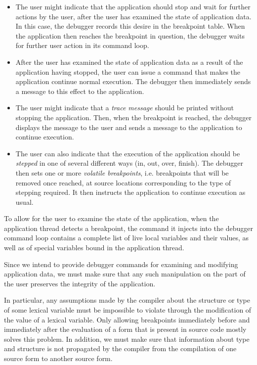\begin{itemize}
\item The user might indicate that the application should stop and
  wait for further actions by the user, after the user has examined
  the state of application data.  In this case, the debugger records
  this desire in the breakpoint table.  When the application then
  reaches the breakpoint in question, the debugger waits for further
  user action in its command loop.
\item After the user has examined the state of application data as a
  result of the application having stopped, the user can issue a
  command that makes the application continue normal execution.  The
  debugger then immediately sends a message to this effect to the
  application.
\item The user might indicate that a \emph{trace message} should be
  printed without stopping the application.  Then, when the breakpoint
  is reached, the debugger displays the message to the user and sends
  a message to the application to continue execution.
\item The user can also indicate that the execution of the application
  should be \emph{stepped} in one of several different ways (in, out,
  over, finish).  The debugger then sets one or more \emph{volatile
    breakpoints}, i.e. breakpoints that will be removed once reached,
  at source locations corresponding to the type of stepping required.
  It then instructs the application to continue execution as usual.
\end{itemize}

To allow for the user to examine the state of the
application, when the application thread detects a breakpoint, the
command it injects into the debugger command loop contains a complete
list of live local variables and their values, as well as of special
variables bound in the application thread.

Since we intend to provide debugger commands for examining and
modifying application data, we must make sure that any such
manipulation on the part of the user preserves the integrity of the
application.

In particular, any assumptions made by the compiler about the
structure or type of some lexical variable must be impossible to
violate through the modification of the value of a lexical variable.
Only allowing breakpoints immediately before and immediately after the
evaluation of a form that is present in source code mostly solves this
problem.  In addition, we must make sure that information about type
and structure is not propagated by the compiler from the compilation
of one source form to another source form.

